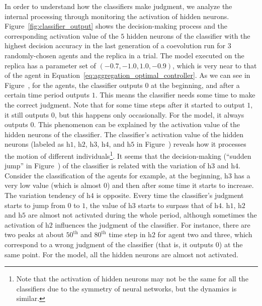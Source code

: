 In order to understand how the classifiers make judgment, we analyze the internal processing through monitoring the activation of hidden neurons. Figure~\ref{fig:classifier_output} shows the decision-making process and the corresponding activation value of the $5$ hidden neurons of the classifier with the highest decision accuracy in the last generation of a coevolution run for $3$ randomly-chosen agents and the replica in a trial. The model executed on the replica has a parameter set of $(-0.7, -1.0, 1.0, -0.9)$, which is very near to that of the agent in Equation~\eqref{eq:aggregation_optimal_controller}. As we can see in Figure~, for the agents, the classifier outputs $0$ at the beginning, and after a certain time period outputs $1$. This means the classifier needs some time to make the correct judgment. Note that for some time steps after it started to output $1$, it still outputs $0$, but this happens only occasionally. For the model, it always outputs $0$.  This phenomenon can be explained by the activation value of the hidden neurons of the classifier. The classifier's activation value of the hidden neurons (labeled as $\textrm{h}1$, $\textrm{h}2$, $\textrm{h}3$, $\textrm{h}4$, and $\textrm{h}5$ in Figure~) reveals how it processes the motion of different individuals\footnote{Note that the activation of hidden neurons may not be the same for all the classifiers due to the symmetry of neural networks, but the dynamics is similar.}. It seems that the decision-making (``sudden jump'' in Figure~) of the classifier is related with the variation of $\textrm{h}3$ and $\textrm{h}4$. Consider the classification of the agents for example, at the beginning, $\textrm{h}3$ has a very low value (which is almost $0$) and then after some time it starts to increase. The variation tendency of $\textrm{h}4$ is opposite.  Every time the classifier's judgment starts to jump from $0$ to $1$, the value of $\textrm{h}3$ starts to surpass that of $\textrm{h}4$. $\textrm{h}1$, $\textrm{h}2$ and $\textrm{h}5$ are almost not activated during the whole period, although sometimes the activation of $\textrm{h}2$ influences the judgment of the classifier. For instance, there are two peaks at about $50^\textrm{th}$ and $80^\textrm{th}$ time step in $\textrm{h}2$ for agent two and three, which correspond to a wrong judgment of the classifier (that is, it outputs $0$) at the same point. For the model, all the hidden neurons are almost not activated.


